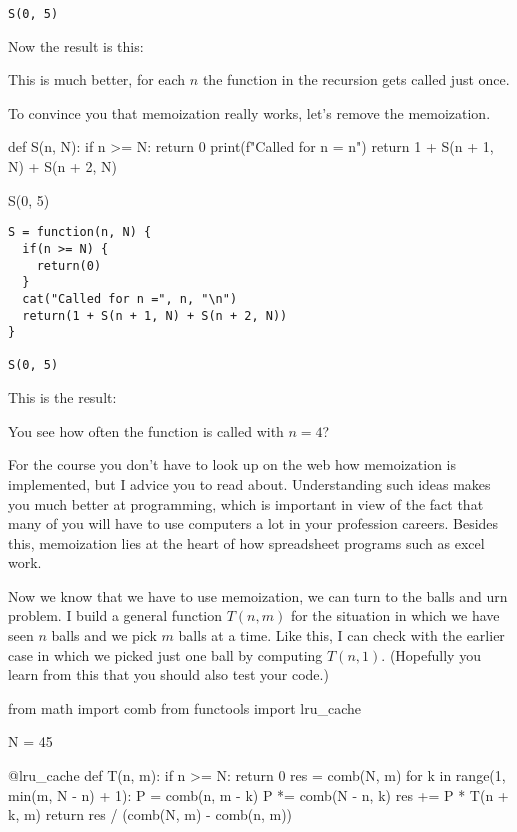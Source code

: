 \begin{exercise}
\begin{solution}
\begin{verbatim}
S(0, 5)
\end{verbatim}
Now the result is this:
\begin{center}
\printpythontex
\end{center}
This is much better, for each $n$ the function in the recursion gets called just once.

To convince you that memoization really works, let's remove the memoization.
\begin{pyblock}
def S(n, N):
    if n >= N:
        return 0
    print(f"Called for n = {n}\n")
    return 1 + S(n + 1, N) + S(n + 2, N)


S(0, 5)
\end{pyblock}
\begin{verbatim}
S = function(n, N) {
  if(n >= N) {
    return(0)
  }
  cat("Called for n =", n, "\n")
  return(1 + S(n + 1, N) + S(n + 2, N))
}

S(0, 5)
\end{verbatim}
This is the result:
\begin{center}
\printpythontex
\end{center}
You see how often the function is called with $n=4$?



For the course you don't have to look up on the web how memoization is implemented, but I advice you to read about.
Understanding such ideas makes you much better at programming, which is important in view of the fact that many of you will have to use computers a lot in your profession careers.
Besides this, memoization lies at the heart of how spreadsheet programs such as excel work.

Now we know that we have to use memoization, we can turn to the balls and urn problem.
I build a general function $T(n,m)$ for the situation in which we have seen $n$ balls and we pick $m$ balls at a time.
Like this, I can check with the earlier case in which we picked just one ball by computing $T(n, 1)$.
(Hopefully you learn from this that you should also test your code.)


\begin{pyblock}
from math import comb
from functools import lru_cache

N = 45


@lru_cache
def T(n, m):
    if n >= N:
        return 0
    res = comb(N, m)
    for k in range(1, min(m, N - n) + 1):
        P = comb(n, m - k)
        P *= comb(N - n, k)
        res += P * T(n + k, m)
    return res / (comb(N, m) - comb(n, m))


\end{pyblock}
\end{solution}
\end{exercise}
